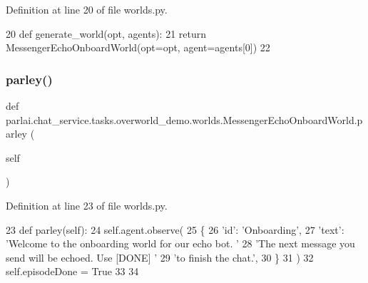 Definition at line 20 of file worlds.\+py.


\begin{DoxyCode}
20     \textcolor{keyword}{def }generate\_world(opt, agents):
21         \textcolor{keywordflow}{return} MessengerEchoOnboardWorld(opt=opt, agent=agents[0])
22 
\end{DoxyCode}
\mbox{\label{classparlai_1_1chat__service_1_1tasks_1_1overworld__demo_1_1worlds_1_1MessengerEchoOnboardWorld_aaf4f7b875e6a7be02164f4f63463e6b0}} 
\subsubsection{\texorpdfstring{parley()}{parley()}}
{\footnotesize\ttfamily def parlai.\+chat\+\_\+service.\+tasks.\+overworld\+\_\+demo.\+worlds.\+Messenger\+Echo\+Onboard\+World.\+parley (\begin{DoxyParamCaption}\item[{}]{self }\end{DoxyParamCaption})}



Definition at line 23 of file worlds.\+py.


\begin{DoxyCode}
23     \textcolor{keyword}{def }parley(self):
24         self.agent.observe(
25             \{
26                 \textcolor{stringliteral}{'id'}: \textcolor{stringliteral}{'Onboarding'},
27                 \textcolor{stringliteral}{'text'}: \textcolor{stringliteral}{'Welcome to the onboarding world for our echo bot. '}
28                 \textcolor{stringliteral}{'The next message you send will be echoed. Use [DONE] '}
29                 \textcolor{stringliteral}{'to finish the chat.'},
30             \}
31         )
32         self.episodeDone = \textcolor{keyword}{True}
33 
34 
\end{DoxyCode}


